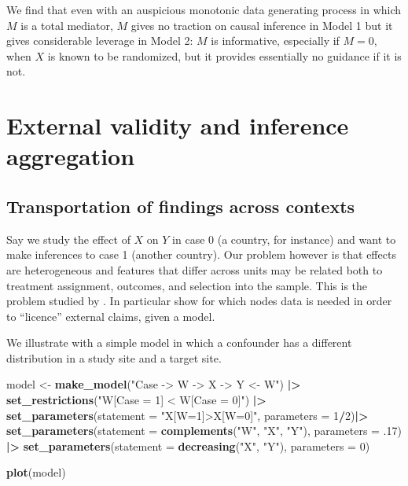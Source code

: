 \documentclass[
  12pt,
]{book}
\newenvironment{Shaded}{\begin{snugshade}}{\end{snugshade}}
\newcommand{\AttributeTok}[1]{\textcolor[rgb]{0.13,0.29,0.53}{#1}}
\newcommand{\DecValTok}[1]{\textcolor[rgb]{0.00,0.00,0.81}{#1}}
\newcommand{\FunctionTok}[1]{\textcolor[rgb]{0.13,0.29,0.53}{\textbf{#1}}}
\newcommand{\NormalTok}[1]{#1}
\newcommand{\OtherTok}[1]{\textcolor[rgb]{0.56,0.35,0.01}{#1}}
\newcommand{\SpecialCharTok}[1]{\textcolor[rgb]{0.81,0.36,0.00}{\textbf{#1}}}
\newcommand{\StringTok}[1]{\textcolor[rgb]{0.31,0.60,0.02}{#1}}
\begin{document}
We find that even with an auspicious monotonic data generating process in which \(M\) is a total mediator, \(M\) gives no traction on causal inference in Model 1 but it gives considerable leverage in Model 2: \(M\) is informative, especially if \(M=0\), when \(X\) is known to be randomized, but it provides essentially no guidance if it is not.

\hypertarget{external-validity-and-inference-aggregation}{%
\chapter{External validity and inference aggregation}\label{external-validity-and-inference-aggregation}}

\hypertarget{transportation-of-findings-across-contexts}{%
\section{Transportation of findings across contexts}\label{transportation-of-findings-across-contexts}}

Say we study the effect of \(X\) on \(Y\) in case 0 (a country, for instance) and want to make inferences to case 1 (another country). Our problem however is that effects are heterogeneous and features that differ across units may be related both to treatment assignment, outcomes, and selection into the sample. This is the problem studied by \citet{pearl2014external}. In particular \citet{pearl2014external} show for which nodes data is needed in order to ``licence'' external claims, given a model.

We illustrate with a simple model in which a confounder has a different distribution in a study site and a target site.

\begin{Shaded}
\begin{Highlighting}[]
\NormalTok{model }\OtherTok{\textless{}{-}} \FunctionTok{make\_model}\NormalTok{(}\StringTok{"Case {-}\textgreater{} W  {-}\textgreater{} X {-}\textgreater{} Y \textless{}{-} W"}\NormalTok{) }\SpecialCharTok{|\textgreater{}}
  \FunctionTok{set\_restrictions}\NormalTok{(}\StringTok{"W[Case = 1] \textless{} W[Case = 0]"}\NormalTok{) }\SpecialCharTok{|\textgreater{}}
  \FunctionTok{set\_parameters}\NormalTok{(}\AttributeTok{statement =} \StringTok{"X[W=1]\textgreater{}X[W=0]"}\NormalTok{, }\AttributeTok{parameters =} \DecValTok{1}\SpecialCharTok{/}\DecValTok{2}\NormalTok{)}\SpecialCharTok{|\textgreater{}}
  \FunctionTok{set\_parameters}\NormalTok{(}\AttributeTok{statement =} \FunctionTok{complements}\NormalTok{(}\StringTok{"W"}\NormalTok{, }\StringTok{"X"}\NormalTok{, }\StringTok{"Y"}\NormalTok{), }\AttributeTok{parameters =}\NormalTok{ .}\DecValTok{17}\NormalTok{) }\SpecialCharTok{|\textgreater{}}
  \FunctionTok{set\_parameters}\NormalTok{(}\AttributeTok{statement =} \FunctionTok{decreasing}\NormalTok{(}\StringTok{"X"}\NormalTok{, }\StringTok{"Y"}\NormalTok{), }\AttributeTok{parameters =} \DecValTok{0}\NormalTok{) }

\FunctionTok{plot}\NormalTok{(model)}
\end{Highlighting}
\end{Shaded}
\end{document}
